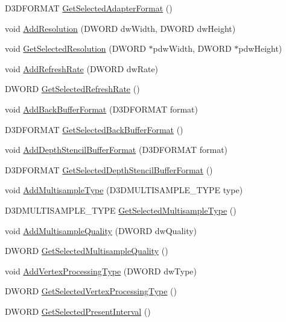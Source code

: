 \begin{DoxyCompactItemize}
D3DFORMAT \hyperlink{class_c_d3_d_settings_dlg_a0a6307d23bd4277db326e440106b02fa}{GetSelectedAdapterFormat} ()
\item 
void \hyperlink{class_c_d3_d_settings_dlg_ae3b20d440c76b3cb09de3f2e1f3fd4a3}{AddResolution} (DWORD dwWidth, DWORD dwHeight)
\item 
void \hyperlink{class_c_d3_d_settings_dlg_a64deb789f38a469aaae9b24a98c1ba89}{GetSelectedResolution} (DWORD $\ast$pdwWidth, DWORD $\ast$pdwHeight)
\item 
void \hyperlink{class_c_d3_d_settings_dlg_a1d0d0f62187b4f88256a866c22755647}{AddRefreshRate} (DWORD dwRate)
\item 
DWORD \hyperlink{class_c_d3_d_settings_dlg_ab2c395b2c12a94c6491d4639617fe1ac}{GetSelectedRefreshRate} ()
\item 
void \hyperlink{class_c_d3_d_settings_dlg_a8794267a14a02e711dca155c2cfc4290}{AddBackBufferFormat} (D3DFORMAT format)
\item 
D3DFORMAT \hyperlink{class_c_d3_d_settings_dlg_a22cb29162c256ff8017867c0f66a404f}{GetSelectedBackBufferFormat} ()
\item 
void \hyperlink{class_c_d3_d_settings_dlg_afd377864abb5683285ec335fe6011c7a}{AddDepthStencilBufferFormat} (D3DFORMAT format)
\item 
D3DFORMAT \hyperlink{class_c_d3_d_settings_dlg_a39ae16cb2d2b7f839e1adf6a982a6d19}{GetSelectedDepthStencilBufferFormat} ()
\item 
void \hyperlink{class_c_d3_d_settings_dlg_a13d7360f5233781dbb2dea92d30a2257}{AddMultisampleType} (D3DMULTISAMPLE\_\-TYPE type)
\item 
D3DMULTISAMPLE\_\-TYPE \hyperlink{class_c_d3_d_settings_dlg_a2789ede2956d2a0e5fa489f4a9ef690c}{GetSelectedMultisampleType} ()
\item 
void \hyperlink{class_c_d3_d_settings_dlg_aecef3b988a7dd637e0a8dece0bd23bc9}{AddMultisampleQuality} (DWORD dwQuality)
\item 
DWORD \hyperlink{class_c_d3_d_settings_dlg_a74ce21d607ccf9071bc6e6bf8a8bde51}{GetSelectedMultisampleQuality} ()
\item 
void \hyperlink{class_c_d3_d_settings_dlg_aa2351f6a7dfaf409b4a1590e4f6c01a8}{AddVertexProcessingType} (DWORD dwType)
\item 
DWORD \hyperlink{class_c_d3_d_settings_dlg_a1c3324649ea149106ca0af2c43f880fe}{GetSelectedVertexProcessingType} ()
\item 
DWORD \hyperlink{class_c_d3_d_settings_dlg_a7819f5df57f56524015c396ef625809e}{GetSelectedPresentInterval} ()

\end{DoxyCompactItemize}
